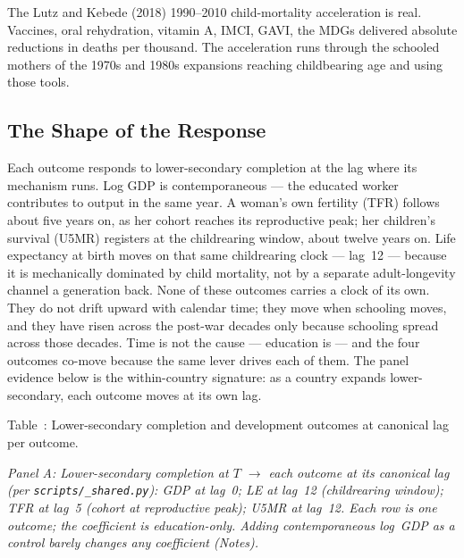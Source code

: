\documentclass[12pt,letterpaper]{article}
\begin{document}
The Lutz and Kebede (2018) 1990--2010 child-mortality acceleration
is real. Vaccines, oral rehydration, vitamin A, IMCI, GAVI, the
MDGs delivered absolute reductions in deaths per thousand. The
acceleration runs through the schooled mothers of the 1970s and
1980s expansions reaching childbearing age and using those tools.

\subsection{The Shape of the Response}\label{the-shape-of-the-response}

Each outcome responds to lower-secondary completion at the lag where
its mechanism runs. Log GDP is contemporaneous --- the educated
worker contributes to output in the same year. A woman's own
fertility (TFR) follows about five years on, as her cohort reaches
its reproductive peak; her children's survival (U5MR) registers at
the childrearing window, about twelve years on. Life expectancy at
birth moves on that same childrearing clock --- lag~12 --- because it
is mechanically dominated by child mortality, not by a separate
adult-longevity channel a generation back. None
of these outcomes carries a clock of its own. They do not drift
upward with calendar time; they move when schooling moves, and they
have risen across the post-war decades only because schooling spread
across those decades. Time is not the cause --- education is --- and
the four outcomes co-move because the same lever drives each of them.
The panel evidence below is the within-country signature: as a
country expands lower-secondary, each outcome moves at its own lag.

\label{tab:edu-outcomes}Table~\thetable: Lower-secondary completion and development outcomes at canonical lag per outcome.

\noindent\textit{Panel A: Lower-secondary completion at $T$ $\to$ each outcome at its canonical lag (per \texttt{scripts/\_shared.py}): GDP at lag~0; LE at lag~12 (childrearing window); TFR at lag~5 (cohort at reproductive peak); U5MR at lag~12. Each row is one outcome; the coefficient is education-only. Adding contemporaneous log~GDP as a control barely changes any coefficient (Notes).}
\end{document}
